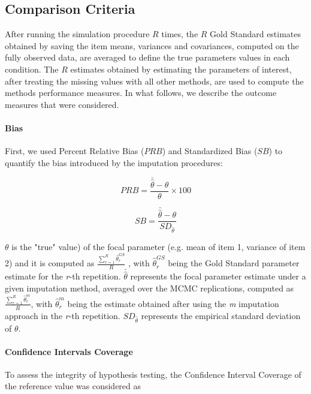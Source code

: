 \subsection{Comparison Criteria} \label{criteria}

	After running the simulation procedure $R$ times, the $R$ Gold Standard estimates obtained by saving the item means, 
	variances and covariances, computed on the fully observed data, are averaged to define the true parameters values 
	in each condition.
	The $R$ estimates obtained by estimating the parameters of interest, after treating the missing values with all other 
	methods, are used to compute the methods performance measures.
	In what follows, we describe the outcome measures that were considered.

	\paragraph{Bias}

	First, we used Percent Relative Bias ($PRB$) and Standardized Bias ($SB$) to quantify the bias introduced by 
	the imputation procedures:

	\begin{equation} \label{eqn:prb}
		PRB = \frac{\bar{\hat{\theta}} - \theta}{\theta} \times 100
	\end{equation}

	\begin{equation} \label{eqn:sb}
		SB =  \frac{\bar{\hat{\theta}} - \theta}{SD_{\hat{\theta}}}
	\end{equation}
	
	$\theta$ is the "true" value) of the focal parameter (e.g. mean of item 1, variance of item 2) and it is 
	computed as 
	$\frac{ \sum_{r=1}^{R} \hat{\theta}_{r}^{GS} }{R}$
	, with
	$\hat{\theta}_{r}^{GS}$ 
	being the Gold Standard parameter estimate for the \emph{r}-th repetition. 
	$\bar{\hat{\theta}}$ represents the focal parameter estimate under a given imputation method, averaged over 
	the MCMC replications, computed as
	$\frac{ \sum_{r=1}^{R} \hat{\theta}_{r}^{m} }{R}$,
	with
	$\hat{\theta}_{r}^{m}$ being the estimate obtained after using the \emph{m} imputation approach in the 
	\emph{r}-th repetition.
	$SD_{\hat{\theta}}$ represents the empirical standard deviation of $\theta$.

	\paragraph{Confidence Intervals Coverage}
	To assess the integrity of hypothesis testing, the Confidence Interval Coverage of the reference value
	was considered as

